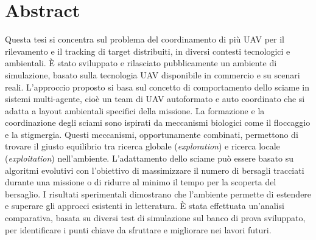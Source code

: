 \chapter*{Abstract}

Questa tesi si concentra sul problema del coordinamento di più UAV per il rilevamento e il tracking di target distribuiti, in diversi contesti tecnologici e ambientali. 
È stato sviluppato e rilasciato pubblicamente un ambiente di simulazione, basato sulla tecnologia UAV disponibile in commercio e su scenari reali. 
L'approccio proposto si basa sul concetto di comportamento dello sciame in sistemi multi-agente, cioè un team di UAV autoformato e auto coordinato che si adatta a layout ambientali specifici della missione. 
La formazione e la coordinazione degli sciami sono ispirati da meccanismi biologici come il floccaggio e la stigmergia. 
Questi meccanismi, opportunamente combinati, permettono di trovare il giusto equilibrio tra ricerca globale (\textit{exploration}) e ricerca locale (\textit{exploitation}) nell'ambiente. 
L'adattamento dello sciame può essere basato su algoritmi evolutivi con l'obiettivo di massimizzare il numero di bersagli tracciati durante una missione o di ridurre al minimo il tempo per la scoperta del bersaglio. 
I risultati sperimentali dimostrano che l'ambiente permette di estendere e superare gli approcci esistenti in letteratura. 
È stata effettuata un'analisi comparativa, basata su diversi test di simulazione sul banco di prova sviluppato, per identificare i punti chiave da sfruttare e migliorare nei lavori futuri.

\restoregeometry